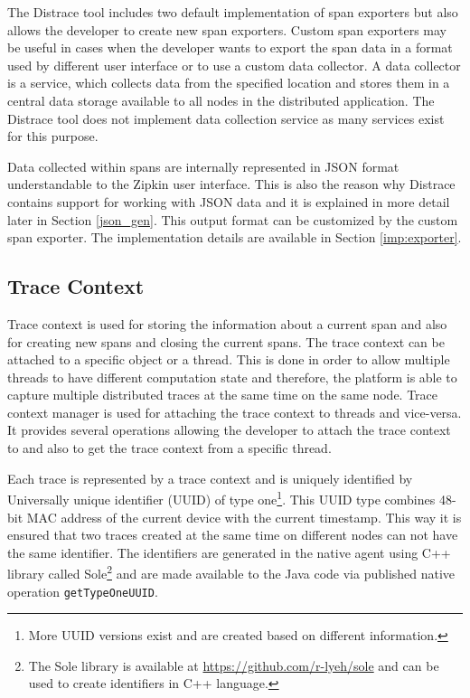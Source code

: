 The Distrace tool includes two default implementation of span exporters but also allows the developer to create new span exporters. Custom span exporters may be useful in cases when the developer wants to export the span data in a format used by different user interface or to use a custom data collector. A data collector is a service, which collects data from the specified location and stores them in a central data storage available to all nodes in the distributed application. The Distrace tool does not implement data collection service as many services exist for this purpose. 

Data collected within spans are internally represented in JSON format understandable to the Zipkin user interface. This is also the reason why Distrace contains support for working with JSON data and it is explained in more detail later in Section \ref{json_gen}. This output format can be customized by the custom span exporter. The implementation details are available in Section \ref{imp:exporter}.
\subsection{Trace Context}
Trace context is used for storing the information about a current span and also for creating new spans and closing the current spans. The trace context can be attached to a specific object or a thread. This is done in order to allow multiple threads to have different computation state and therefore, the platform is able to capture multiple distributed traces at the same time on the same node. Trace context manager is used for attaching the trace context to threads and vice-versa. It provides several operations allowing the developer to attach the trace context to and also to get the trace context from a specific thread.

Each trace is represented by a trace context and is uniquely identified by Universally unique identifier (UUID) of type one\footnote{More UUID versions exist and are created based on different information.}. This UUID type combines 48-bit MAC address of the current device with the current timestamp. This way it is ensured that two traces created at the same time on different nodes can not have the same identifier. The identifiers are generated in the native agent using C++ library called Sole\footnote{The Sole library is available at \url{https://github.com/r-lyeh/sole} and can be used to create identifiers in C++ language.} and are made available to the Java code via published native operation \texttt{getTypeOneUUID}.

